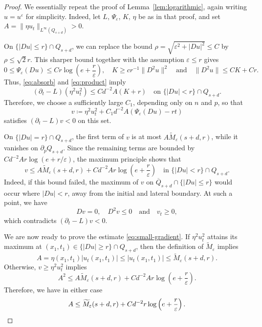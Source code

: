 \documentclass[a4paper,11pt]{amsart}
\theoremstyle{plain}
\theoremstyle{definition}
\numberwithin{equation}{section}
\begin{document}
\begin{proof}
We essentially repeat the proof of Lemma~\ref{lem:logarithmic}, again writing $u=u^\varepsilon$ for simplicity. Indeed, let $L$, $\Psi_\varepsilon$, $K$, $\eta$ be as in that proof, and set $A=\|\eta u_t\|_{L^\infty(Q_{s+d})}>0$.

On $\{|Du|\leq r\} \cap Q_{s+d}$, we can replace the bound $\rho=\sqrt{\varepsilon^2+|Du|^2} \leq C$ by $\rho \leq \sqrt{2}r$. This sharper bound together with the assumption $\varepsilon\leq r$ gives 
\begin{equation*}
     0\leq\Psi_\varepsilon(Du) \leq Cr\log\left(e+\frac{r}{\varepsilon}\right), \quad 
     K \geq cr^{-1}\|D^2u\|^2\quad\text{and}\quad 
     \|D^2u\| \leq CK+Cr.
\end{equation*}
Thus, \eqref{eq:absorb} and \eqref{eq:product} imply
\begin{equation*}
    (\partial_t-L)(\eta^2u_t^2)\leq Cd^{-2}A(K+r)\quad\text{on }\{|Du|<r\}\cap Q_{s+d}.
\end{equation*}
Therefore, we choose a sufficiently large $C_1$, depending only on $n$ and $p$, so that
\begin{equation*}
    v\coloneqq\eta^2u_t^2+C_1d^{-2}A(\Psi_\varepsilon(Du)-rt)
\end{equation*}
satisfies $(\partial_t-L)v<0$ on this set.

On $\{|Du|=r\} \cap Q_{s+d}$, the first term of $v$ is at most $A\widetilde M_\varepsilon(s+d,r)$, while it vanishes on $\partial_pQ_{s+d}$. Since the remaining terms are bounded by $Cd^{-2}Ar\log(e+r/\varepsilon)$, the maximum principle shows that
\begin{equation*}
    v\leq A\widetilde M_\varepsilon(s+d,r)+Cd^{-2}Ar\log\left(e+\frac r\varepsilon\right)
 \quad\text{in $\{|Du|<r\}\cap Q_{s+d}$}.
\end{equation*}
Indeed, if this bound failed, the maximum of $v$ on $\overline{Q}_{s+d}\cap\{|Du|\leq r\}$ would occur where $|Du|<r$, away from the initial and lateral boundary. At such a point, we have 
\begin{equation*}
    Dv=0, \quad D^2v\leq 0 \quad\text{and}\quad v_t\geq0,     
\end{equation*}
which contradicts $(\partial_t-L)v<0$. 

We are now ready to prove the estimate \eqref{eq:small-gradient}. If $\eta^2u_t^2$ attains its maximum at $(x_1, t_1) \in \{|Du|\geq r\} \cap Q_{s+d}$, then the definition of $\widetilde{M}_{\varepsilon}$ implies 
\begin{equation*}
    A=\eta(x_1, t_1)|u_t(x_1, t_1)| \leq |u_t(x_1, t_1)| \leq \widetilde{M}_{\varepsilon}(s+d, r).
\end{equation*}
Otherwise, $v\geq\eta^2u_t^2$ implies
\begin{equation*}
    A^2\leq A\widetilde M_\varepsilon(s+d,r)+Cd^{-2}Ar\log\left(e+\frac r\varepsilon\right).
\end{equation*}
Therefore, we have in either case
\begin{equation*}
 A\leq\widetilde M_\varepsilon(s+d,r)+Cd^{-2}r\log\left(e+\frac r\varepsilon\right).\qedhere
\end{equation*}
\end{proof}
\end{document}
